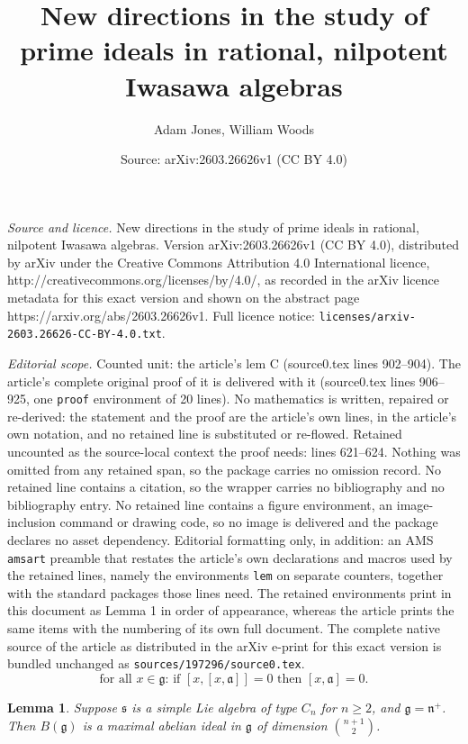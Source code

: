 \documentclass[10pt,a4paper]{amsart}
\title{New directions in the study of prime ideals in rational, nilpotent Iwasawa algebras}
\author{Adam Jones, William Woods}
\date{Source: arXiv:2603.26626v1 (CC BY 4.0)}
\newtheorem{lem}{Lemma}
\begin{document}
\maketitle

\noindent\emph{Source and licence.} New directions in the study of prime ideals in rational, nilpotent Iwasawa algebras. Version arXiv:2603.26626v1 (CC BY 4.0), distributed by arXiv under the Creative Commons Attribution 4.0 International licence, http://creativecommons.org/licenses/by/4.0/, as recorded in the arXiv licence metadata for this exact version and shown on the abstract page https://arxiv.org/abs/2603.26626v1. Full licence notice: \texttt{licenses/arxiv-2603.26626-CC-BY-4.0.txt}.\par\smallskip

\noindent\textit{Editorial scope.} Counted unit: the article's lem C (source0.tex lines 902--904). The article's complete original proof of it is delivered with it (source0.tex lines 906--925, one \texttt{proof} environment of 20 lines). No mathematics is written, repaired or re-derived: the statement and the proof are the article's own lines, in the article's own notation, and no retained line is substituted or re-flowed.  Retained uncounted as the source-local context the proof needs: lines 621--624.  Nothing was omitted from any retained span, so the package carries no omission record.  No retained line contains a citation, so the wrapper carries no bibliography and no bibliography entry.  No retained line contains a figure environment, an image-inclusion command or drawing code, so no image is delivered and the package declares no asset dependency.  Editorial formatting only, in addition: an AMS \texttt{amsart} preamble that restates the article's own declarations and macros used by the retained lines, namely the environments \texttt{lem} on separate counters, together with the standard packages those lines need.  The retained environments print in this document as Lemma 1 in order of appearance, whereas the article prints the same items with the numbering of its own full document.  The complete native source of the article as distributed in the arXiv e-print for this exact version is bundled unchanged as \texttt{sources/197296/source0.tex}.
\begin{equation}\label{eqn: 2star}
\tag{$**$}
\text{for all } x\in \mathfrak{g}:\, \text{if } [x,[x,\mathfrak{a}]] = 0 \text{ then } [x,\mathfrak{a}] = 0.
\end{equation}

\begin{lem}\label{lem: type C}
Suppose $\mathfrak{s}$ is a simple Lie algebra of type $C_n$ for $n\geq 2$, and $\mathfrak{g}=\mathfrak{n}^+$. Then $B(\mathfrak{g})$ is a maximal abelian ideal in $\mathfrak{g}$ of dimension $\binom{n+1}{2}$.
\end{lem}
\end{document}

